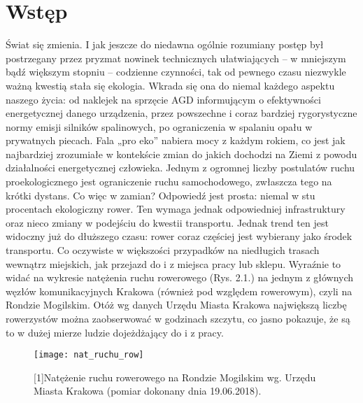 \chapter{Wstęp}
\label{cha:wstep}

Świat się zmienia. I jak jeszcze do niedawna ogólnie rozumiany postęp był postrzegany przez pryzmat nowinek technicznych ułatwiających – w mniejszym bądź większym stopniu – codzienne czynności, tak od pewnego czasu niezwykle ważną kwestią stała się ekologia. Wkrada się ona do niemal każdego aspektu naszego życia: od naklejek na sprzęcie AGD informującym o efektywności energetycznej danego urządzenia, przez powszechne i coraz bardziej rygorystyczne normy emisji silników spalinowych, po ograniczenia w spalaniu opału w prywatnych piecach. Fala „pro eko” nabiera mocy z każdym rokiem, co jest jak najbardziej zrozumiałe w kontekście zmian do jakich dochodzi na Ziemi z powodu działalności energetycznej człowieka. Jednym z ogromnej liczby postulatów ruchu proekologicznego jest ograniczenie ruchu samochodowego, zwłaszcza tego na krótki dystans. Co więc w zamian? Odpowiedź jest prosta: niemal w stu procentach ekologiczny rower. Ten wymaga jednak odpowiedniej infrastruktury oraz nieco zmiany w podejściu do kwestii transportu. \newline
Jednak trend ten jest widoczny już do dłuższego czasu: rower coraz częściej jest wybierany jako środek transportu. Co oczywiste w większości przypadków na niedługich trasach wewnątrz miejskich, jak przejazd do i z miejsca pracy lub sklepu. Wyraźnie to widać na wykresie natężenia ruchu rowerowego (Rys. 2.1.)  na jednym z głównych węzłów komunikacyjnych Krakowa (również pod względem rowerowym), czyli na Rondzie Mogilskim. Otóż wg danych Urzędu Miasta Krakowa największą liczbę rowerzystów można zaobserwować w godzinach szczytu, co jasno pokazuje, że są to w dużej mierze ludzie dojeżdżający do i z pracy.
\begin{figure}[H]
\centering
\texttt{[image: nat\_ruchu\_row]}
\caption{[1]Natężenie ruchu rowerowego na Rondzie Mogilskim wg. Urzędu Miasta Krakowa (pomiar dokonany dnia 19.06.2018).}
\end{figure}
